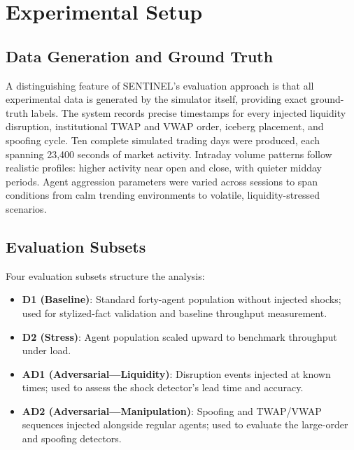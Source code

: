 \documentclass[conference]{IEEEtran}
\begin{document}
\section{Experimental Setup}

\subsection{Data Generation and Ground Truth}

A distinguishing feature of SENTINEL's evaluation approach is that
all experimental data is generated by the simulator itself, providing
exact ground-truth labels. The system records precise timestamps for
every injected liquidity disruption, institutional TWAP and VWAP
order, iceberg placement, and spoofing cycle. Ten complete simulated
trading days were produced, each spanning 23,400 seconds of market
activity. Intraday volume patterns follow realistic profiles: higher
activity near open and close, with quieter midday periods. Agent
aggression parameters were varied across sessions to span conditions
from calm trending environments to volatile, liquidity-stressed
scenarios.

\subsection{Evaluation Subsets}

Four evaluation subsets structure the analysis:

\begin{itemize}
    \item \textbf{D1 (Baseline)}: Standard forty-agent population
    without injected shocks; used for stylized-fact validation and
    baseline throughput measurement.

    \item \textbf{D2 (Stress)}: Agent population scaled upward to
    benchmark throughput under load.

    \item \textbf{AD1 (Adversarial---Liquidity)}: Disruption events
    injected at known times; used to assess the shock detector's
    lead time and accuracy.

    \item \textbf{AD2 (Adversarial---Manipulation)}: Spoofing and
    TWAP/VWAP sequences injected alongside regular agents; used to
    evaluate the large-order and spoofing detectors.
\end{itemize}
\end{document}
